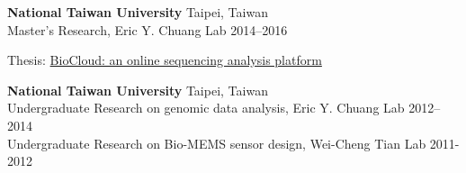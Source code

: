 \begin{entrylist}
	\item \textbf{National Taiwan University} \hfill Taipei, Taiwan\\
	Master's Research, Eric Y. Chuang Lab \hfill
	2014--2016
	\begin{detaillist}
		\item Thesis: \href{https://doi.org/10.6342/NTU201601295}{BioCloud: an online sequencing analysis platform}
	\end{detaillist}

	\item \textbf{National Taiwan University} \hfill Taipei, Taiwan\\
	Undergraduate Research on genomic data analysis, Eric Y. Chuang Lab \hfill
	2012--2014\\
	Undergraduate Research on Bio-MEMS sensor design, Wei-Cheng Tian Lab \hfill
	2011-2012

\end{entrylist}
